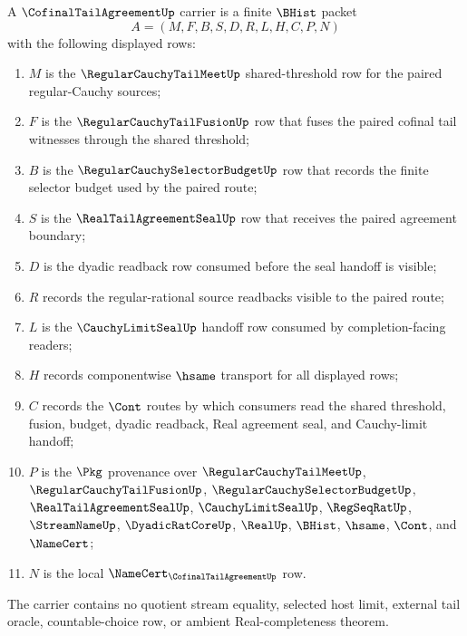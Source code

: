 \begin{definition}
\label{def:cofinal-tail-agreement-carrier}
A $\CofinalTailAgreementUp$ carrier is a finite $\BHist$ packet
$$
A=(M,F,B,S,D,R,L,H,C,P,N)
$$
with the following displayed rows:
\begin{enumerate}
\item $M$ is the $\RegularCauchyTailMeetUp$ shared-threshold row for the paired regular-Cauchy sources;
\item $F$ is the $\RegularCauchyTailFusionUp$ row that fuses the paired cofinal tail witnesses through the shared threshold;
\item $B$ is the $\RegularCauchySelectorBudgetUp$ row that records the finite selector budget used by the paired route;
\item $S$ is the $\RealTailAgreementSealUp$ row that receives the paired agreement boundary;
\item $D$ is the dyadic readback row consumed before the seal handoff is visible;
\item $R$ records the regular-rational source readbacks visible to the paired route;
\item $L$ is the $\CauchyLimitSealUp$ handoff row consumed by completion-facing readers;
\item $H$ records componentwise $\hsame$ transport for all displayed rows;
\item $C$ records the $\Cont$ routes by which consumers read the shared threshold, fusion, budget, dyadic readback, Real agreement seal, and Cauchy-limit handoff;
\item $P$ is the $\Pkg$ provenance over $\RegularCauchyTailMeetUp$, $\RegularCauchyTailFusionUp$, $\RegularCauchySelectorBudgetUp$, $\RealTailAgreementSealUp$, $\CauchyLimitSealUp$, $\RegSeqRatUp$, $\StreamNameUp$, $\DyadicRatCoreUp$, $\RealUp$, $\BHist$, $\hsame$, $\Cont$, and $\NameCert$;
\item $N$ is the local $\NameCert_{\CofinalTailAgreementUp}$ row.
\end{enumerate}
The carrier contains no quotient stream equality, selected host limit, external tail oracle, countable-choice row, or ambient Real-completeness theorem.
\end{definition}

